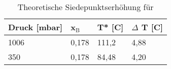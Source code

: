 	\begin{table}[H]
		\centering
		\label{tab:Siedepunkt_CaCl2}
			\begin{tabular}{|l|l|l|l|}
			\hline
			\textbf{Druck [mbar]}	&	\textbf{x$_\text{B}$}	&	\textbf{T* [C]} & \textbf{$\Delta$ T [C]} \\\hline
			1006	&	0,178	&	111,2	&	4,88 \\
			350		&	0,178	&	84,48	&	4,20 \\\hline
			\end{tabular}
			\caption{Theoretische Siedepunktserhöhung für }
	\end{table} 		

	